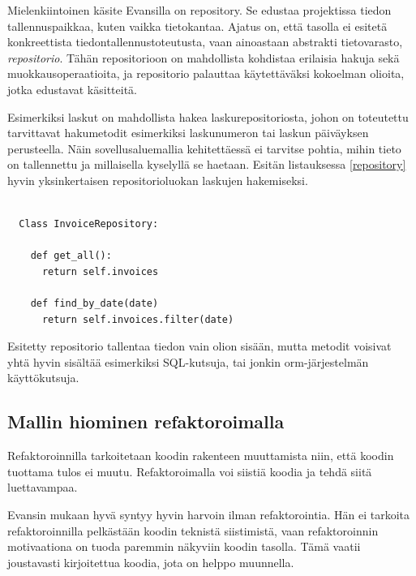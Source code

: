 Mielenkiintoinen käsite Evansilla on \gls{repository}. Se edustaa
projektissa tiedon tallennuspaikkaa, kuten vaikka tietokantaa. Ajatus
on, että  tasolla ei esitetä
konkreettista tiedontallennustoteutusta, vaan ainoastaan abstrakti
tietovarasto, \emph{repositorio}. Tähän repositorioon on mahdollista
kohdistaa erilaisia hakuja sekä muokkausoperaatioita, ja repositorio
palauttaa käytettäväksi kokoelman olioita, jotka edustavat
 käsitteitä.

Esimerkiksi laskut on mahdollista hakea laskurepositoriosta, johon on
toteutettu tarvittavat hakumetodit esimerkiksi laskunumeron tai laskun
päiväyksen perusteella. Näin sovellusaluemallia kehitettäessä ei
tarvitse pohtia, mihin tieto on tallennettu ja millaisella kyselyllä se
haetaan. Esitän listauksessa \ref{repository} hyvin yksinkertaisen
repositorioluokan laskujen hakemiseksi.

\begin{code}
  \begin{verbatim}
  
  Class InvoiceRepository:
  
    def get_all():
      return self.invoices
      
    def find_by_date(date)
      return self.invoices.filter(date)

\end{verbatim}
  \label{repository}
\end{code}

Esitetty repositorio tallentaa tiedon vain olion sisään, mutta metodit
voisivat yhtä hyvin sisältää esimerkiksi SQL-kutsuja, tai jonkin
\gls{orm}-järjestelmän käyttökutsuja.

\hypertarget{mallin-hiominen-refaktoroimalla}{%
\subsection{Mallin hiominen
refaktoroimalla}\label{mallin-hiominen-refaktoroimalla}}

Refaktoroinnilla tarkoitetaan koodin rakenteen muuttamista niin, että
koodin tuottama tulos ei muutu. Refaktoroimalla voi siistiä koodia ja
tehdä siitä luettavampaa.

Evansin mukaan hyvä  syntyy hyvin harvoin
ilman refaktorointia. Hän ei tarkoita refaktoroinnilla pelkästään koodin
teknistä siistimistä, vaan refaktoroinnin motivaationa on tuoda
 paremmin näkyviin koodin tasolla. Tämä vaatii
joustavasti kirjoitettua koodia, jota on helppo
muunnella.\cite[osa 3.]{evans:ddd}

